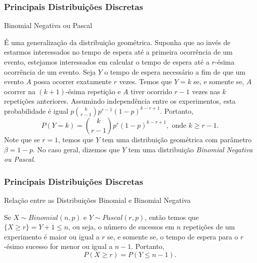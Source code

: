 \begin{frame}
\frametitle{\textbf{Principais Distribuições Discretas}}
\baselineskip=13pt
\begin{block}{Binomial Negativa ou Pascal}

É uma generalização da distribuição
geométrica. Suponha que ao invés de estarmos interessados no tempo
de espera até a primeira ocorrência de um evento, estejamos
interessados em calcular o tempo de espera até a $r$-ésima
ocorrência de um evento. Seja $Y$ o tempo de espera necessário a fim
de que um evento $A$ possa ocorrer exatamente $r$ vezes. Temos que
$Y=k$ se, e somente se, $A$ ocorrer na $(k+1)$-ésima repetição e $A$
tiver ocorrido $r-1$ vezes nas $k$ repetições anteriores. Assumindo
independência entre os experimentos, esta probabilidade é igual
$p\binom{k}{r-1}p^{r-1}(1-p)^{k-r+1}$. Portanto,
$$P(Y=k)=\binom{k}{r-1}p^{r}(1-p)^{k-r+1},\mbox{ onde }k\geq r-1.$$
Note que se $r=1$, temos que $Y$ tem uma distribuição geométrica com
parâmetro $\beta=1-p$. No caso geral, dizemos que $Y$ tem uma
distribuição {\em Binomial Negativa ou Pascal}.

\end{block}
\end{frame}
%
\begin{frame}
\frametitle{\textbf{Principais Distribuições Discretas}}
\baselineskip=13pt
\begin{block}{Relação entre as Distribuições Binomial e Binomial Negativa}


Se $X\sim Binomial(n,p)$ e $Y\sim Pascal(r,p)$, então
temos que $\{X\geq r\}=Y+1\leq n$, ou seja, o número de sucessos em
$n$ repetições de um experimento é maior ou igual a $r$ se, e somente se, o tempo de
espera para o $r$-ésimo sucesso for menor ou igual a $n-1$.
Portanto,
$$P(X\geq r)=P(Y\leq n-1).$$

\end{block}
\end{frame}

